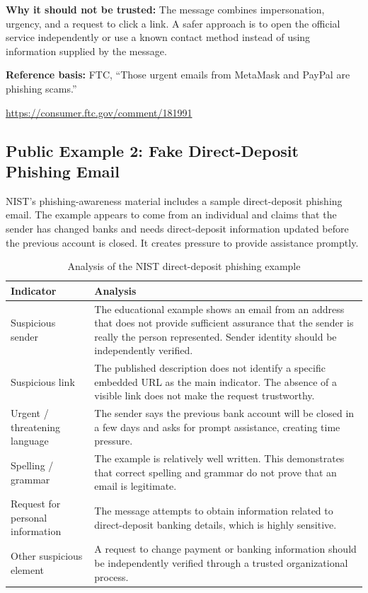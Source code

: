 \documentclass[12pt,a4paper]{article}
\newcommand{\referenceblock}[2]{%
\begin{samepage}
\noindent\textbf{Reference basis:} #1\par
\smallskip
\noindent\url{#2}\par
\end{samepage}
\par\vspace{0.25cm}
}
\begin{document}
\textbf{Why it should not be trusted:} The message combines impersonation,
urgency, and a request to click a link. A safer approach is to open the
official service independently or use a known contact method instead of
using information supplied by the message.

\referenceblock{FTC, ``Those urgent emails from MetaMask and PayPal are phishing scams.''}{https://consumer.ftc.gov/comment/181991}

\subsection{Public Example 2: Fake Direct-Deposit Phishing Email}

NIST's phishing-awareness material includes a sample direct-deposit
phishing email. The example appears to come from an individual and
claims that the sender has changed banks and needs direct-deposit
information updated before the previous account is closed. It creates
pressure to provide assistance promptly.

\begin{table}[H]
\centering
\small
\renewcommand{\arraystretch}{1.35}
\begin{tabular}{|p{4.0cm}|p{9.2cm}|}
\hline
\textbf{Indicator} & \textbf{Analysis}\\
\hline
Suspicious sender & The educational example shows an email from an address that does not provide sufficient assurance that the sender is really the person represented. Sender identity should be independently verified.\\
\hline
Suspicious link & The published description does not identify a specific embedded URL as the main indicator. The absence of a visible link does not make the request trustworthy.\\
\hline
Urgent / threatening language & The sender says the previous bank account will be closed in a few days and asks for prompt assistance, creating time pressure.\\
\hline
Spelling / grammar & The example is relatively well written. This demonstrates that correct spelling and grammar do not prove that an email is legitimate.\\
\hline
Request for personal information & The message attempts to obtain information related to direct-deposit banking details, which is highly sensitive.\\
\hline
Other suspicious element & A request to change payment or banking information should be independently verified through a trusted organizational process.\\
\hline
\end{tabular}
\caption{Analysis of the NIST direct-deposit phishing example}
\label{tab:direct-deposit-analysis}
\end{table}
\end{document}
